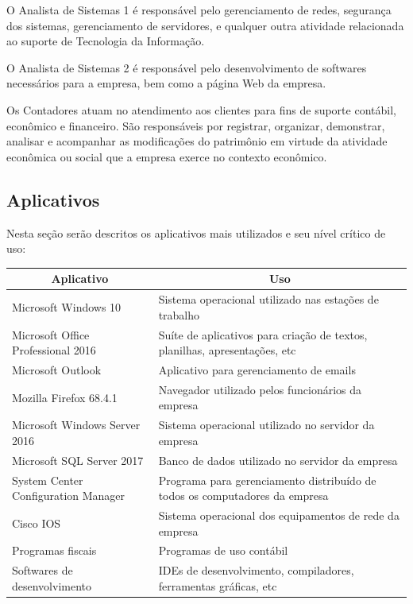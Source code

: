 \documentclass[	DIV=calc,%
							paper=a4,%
							fontsize=12pt,%
							onecolumn]{scrartcl}	 					%
\begin{document}
O Analista de Sistemas 1 é responsável pelo gerenciamento de redes, segurança dos sistemas, gerenciamento de servidores, e qualquer outra atividade relacionada ao suporte de Tecnologia da Informação.

O Analista de Sistemas 2 é responsável pelo desenvolvimento de softwares necessários para a empresa, bem como a página Web da empresa.

Os Contadores atuam no atendimento aos clientes para fins de suporte contábil, econômico e financeiro. São responsáveis por registrar, organizar, demonstrar, analisar e acompanhar as modificações do patrimônio em virtude da atividade econômica ou social que a empresa exerce no contexto econômico.

\subsection{Aplicativos}

Nesta seção serão descritos os aplicativos mais utilizados e seu nível crítico de uso:

\begin{table}[]
	\begin{tabular}{|l|l|}
		\hline
		\multicolumn{1}{|c|}{\textbf{Aplicativo}} & \multicolumn{1}{c|}{\textbf{Uso}}                                           \\ \hline
		Microsoft Windows 10                      & Sistema operacional utilizado nas estações de trabalho                      \\ \hline
		Microsoft Office Professional 2016        & Suíte de aplicativos para criação de textos, planilhas, apresentações, etc  \\ \hline
		Microsoft Outlook                         & Aplicativo para gerenciamento de emails                                     \\ \hline
		Mozilla Firefox 68.4.1                    & Navegador utilizado pelos funcionários da empresa                           \\ \hline
		Microsoft Windows Server 2016             & Sistema operacional utilizado no servidor da empresa                        \\ \hline
		Microsoft SQL Server 2017                 & Banco de dados utilizado no servidor da empresa                             \\ \hline
		System Center Configuration Manager       & Programa para gerenciamento distribuído de todos os computadores da empresa \\ \hline
		Cisco IOS                                 & Sistema operacional dos equipamentos de rede da empresa                     \\ \hline
		Programas fiscais                         & Programas de uso contábil                                                   \\ \hline
		Softwares de desenvolvimento              & IDEs de desenvolvimento, compiladores, ferramentas gráficas, etc            \\ \hline
	\end{tabular}
\end{table}
\end{document}
